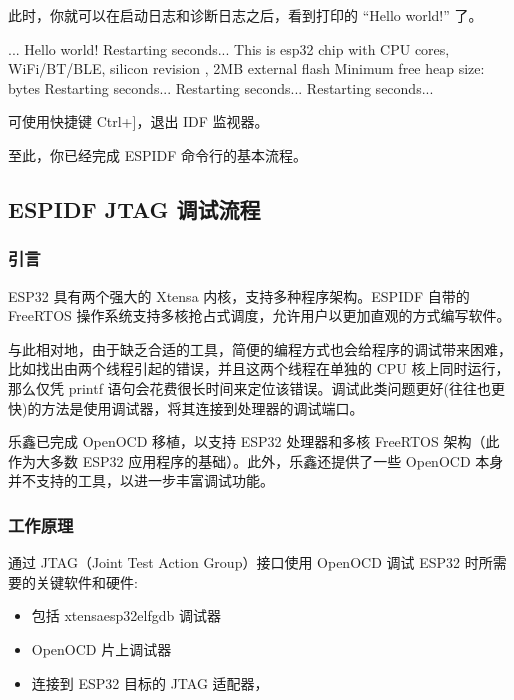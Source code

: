 \documentclass[a4paper,12pt,english]{sphinxmanual}
\begin{document}
\sphinxAtStartPar
此时，你就可以在启动日志和诊断日志之后，看到打印的 “Hello world!” 了。

\begin{sphinxVerbatim}[commandchars=\\\{\}]
...
Hello world!
Restarting   seconds...
This is esp32 chip with  CPU cores, WiFi/BT/BLE, silicon revision , 2MB external flash
Minimum free heap size:  bytes
Restarting   seconds...
Restarting   seconds...
Restarting   seconds...
\end{sphinxVerbatim}

\sphinxAtStartPar
可使用快捷键 Ctrl+{]}，退出 IDF 监视器。

\sphinxAtStartPar
至此，你已经完成 ESP\sphinxhyphen{}IDF 命令行的基本流程。

\sphinxstepscope


\subsection{ESP\sphinxhyphen{}IDF JTAG 调试流程}
\label{\detokenize{exp-esp32/ide/esp-idf-cli-debug:esp-idf-jtag}}\label{\detokenize{exp-esp32/ide/esp-idf-cli-debug::doc}}

\subsubsection{引言}
\label{\detokenize{exp-esp32/ide/esp-idf-cli-debug:id1}}
\sphinxAtStartPar
ESP32 具有两个强大的 Xtensa 内核，支持多种程序架构。ESP\sphinxhyphen{}IDF 自带的 FreeRTOS 操作系统支持多核抢占式调度，允许用户以更加直观的方式编写软件。

\sphinxAtStartPar
与此相对地，由于缺乏合适的工具，简便的编程方式也会给程序的调试带来困难，比如找出由两个线程引起的错误，并且这两个线程在单独的 CPU 核上同时运行，那么仅凭 printf 语句会花费很长时间来定位该错误。调试此类问题更好(往往也更快)的方法是使用调试器，将其连接到处理器的调试端口。

\sphinxAtStartPar
乐鑫已完成 OpenOCD 移植，以支持 ESP32 处理器和多核 FreeRTOS 架构（此作为大多数 ESP32 应用程序的基础）。此外，乐鑫还提供了一些 OpenOCD 本身并不支持的工具，以进一步丰富调试功能。


\subsubsection{工作原理}
\label{\detokenize{exp-esp32/ide/esp-idf-cli-debug:id2}}
\sphinxAtStartPar
通过 JTAG（Joint Test Action Group）接口使用 OpenOCD 调试 ESP32 时所需要的关键软件和硬件:
\begin{itemize}
\item {} 
\sphinxAtStartPar
包括 xtensa\sphinxhyphen{}esp32\sphinxhyphen{}elf\sphinxhyphen{}gdb 调试器

\item {} 
\sphinxAtStartPar
OpenOCD 片上调试器

\item {} 
\sphinxAtStartPar
连接到 ESP32 目标的 JTAG 适配器，

\end{itemize}
\end{document}
